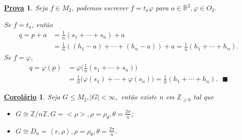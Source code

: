 \documentclass{article}
\newtheorem*{crl*}{\underline{Corol\'ario}}
\newtheorem*{proof*}{\underline{Prova}}
\renewcommand\qedsymbol{$\blacksquare$}
\begin{document}
\begin{proof*}
  Seja \(f\in M_{2}\), podemos escrever \(f=t_{a}\varphi \) para \(a\in \mathbb{R}^{2}, \varphi \in O_{2}\).

  Se \(f=t_{a}\), então 
 \begin{align*}
   q = p + a &=\frac{1}{n}(s_{1}+\cdots+s_{n})+a \\
             &=\frac{1}{n}((h_{1}-a)+\cdots+(h_{n}-a)) + a = \frac{1}{n}(h_{1}+\cdots+h_{n}).
 \end{align*}
 Se \(f=\varphi \),  
\begin{align*}
  q = \varphi (p) &= \varphi \biggl(\frac{1}{n}(s_{1}+\cdots+s_{n})\biggr)\\
                  &=\frac{1}{n}\biggl(\varphi (s_{1})+\cdots+\varphi (s_{n})\biggr) = \frac{1}{n}(h_{1}+\cdots+h_{n}).\text{ \qedsymbol}
\end{align*}
\end{proof*}
\begin{crl*}
  Seja \(G\leq M_{2}, |G| < \infty,\) então existe n em \(\mathbb{Z}_{\geq 0}\) tal que 
 \begin{itemize}
   \item[a)] \(G\cong{\mathbb{Z}/n \mathbb{Z}}, G = <\rho >, \rho =\rho _{\theta }, \theta =\frac{2\pi }{n}\);
   \item[b)] \(G\cong{D_{n}}=\left< r, \rho  \right>, \rho =\rho _{\theta }, \theta =\frac{2\pi }{n}\).
 \end{itemize}
\end{crl*}
\end{document}
